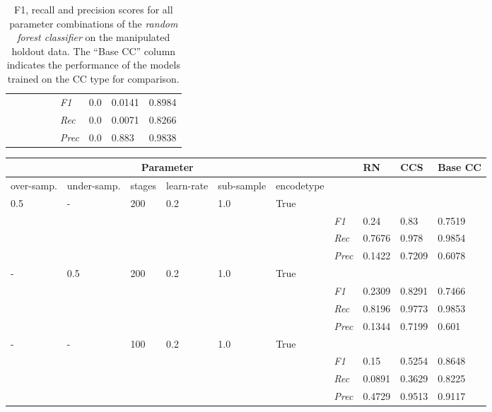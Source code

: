 \begin{table}[H]
\begin{tabularx}{\textwidth}{XXXXX|X|X|X|X}
    & & & & & \textit{F1} & 0.0 & 0.0141    & 0.8984    \\
    & & & & & \textit{Rec} &  0.0 & 0.0071 & 0.8266   \\
    & & & & & \textit{Prec} & 0.0 & 0.883 & 0.9838 \\ \midrule
    \end{tabularx}
    \caption{F1, recall and precision scores for all parameter combinations of the \textit{random forest classifier} on the manipulated holdout data. The \enquote{Base CC} column indicates the performance of the models trained on the CC type for comparison. }
    \label{tab:rq3_random_forest}
    \end{table}
    
    \begin{table}[H]
    \tiny
    \tabcolsep=0.11cm
    \begin{tabularx}{\textwidth}{XXXXXX|X|X|X|X}
    \toprule
    \multicolumn{6}{c}{Parameter} & & RN &  CCS & Base CC \\ \midrule
    over-\newline samp. & under-\newline samp. & stages &learn-\newline rate & sub-\newline sample & encode\newline type & & & & \\ \midrule
    0.5 & - & 200 & 0.2 & 1.0 &True & & & & \\
    & & & & & & \textit{F1} & 0.24 & 0.83   & 0.7519     \\
    & & & & & & \textit{Rec} &  0.7676 & 0.978 & 0.9854   \\
    & & & & & & \textit{Prec} & 0.1422 & 0.7209 & 0.6078 \\ \midrule
    - & 0.5 & 200 & 0.2 & 1.0 &True & & & & \\
    & & & & & & \textit{F1} & 0.2309 & 0.8291   & 0.7466     \\
    & & & & & & \textit{Rec} &  0.8196 & 0.9773 & 0.9853   \\
    & & & & & & \textit{Prec} & 0.1344 & 0.7199 & 0.601 \\ \midrule
    - & - & 100 & 0.2 & 1.0 &True & & & & \\
    & & & & & & \textit{F1} & 0.15 & 0.5254   & 0.8648     \\
    & & & & & & \textit{Rec} &  0.0891 & 0.3629 & 0.8225   \\
    & & & & & & \textit{Prec} & 0.4729 & 0.9513 & 0.9117 \\ \midrule

\end{tabularx}
\end{table}
